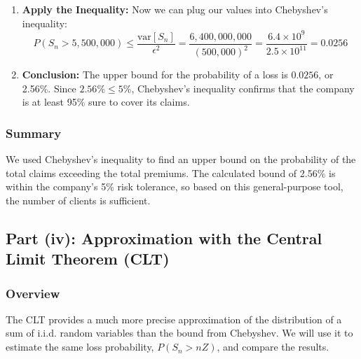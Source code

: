 \documentclass[11pt,a4paper]{article}
\begin{document}
\begin{enumerate}
    \item \textbf{Apply the Inequality:} Now we can plug our values into Chebyshev's inequality:
    \[ P(S_n > 5,500,000) \le \frac{\text{var}[S_n]}{\epsilon^2} = \frac{6,400,000,000}{(500,000)^2} = \frac{6.4 \times 10^9}{2.5 \times 10^{11}} = 0.0256 \]

    \item \textbf{Conclusion:} The upper bound for the probability of a loss is $0.0256$, or 2.56\%. Since $2.56\% \le 5\%$, Chebyshev's inequality confirms that the company is at least 95\% sure to cover its claims.
\end{enumerate}

\subsubsection{Summary}
We used Chebyshev's inequality to find an upper bound on the probability of the total claims exceeding the total premiums. The calculated bound of 2.56\% is within the company's 5\% risk tolerance, so based on this general-purpose tool, the number of clients is sufficient.

\subsection{Part (iv): Approximation with the Central Limit Theorem (CLT)}

\subsubsection{Overview}
The CLT provides a much more precise approximation of the distribution of a sum of i.i.d. random variables than the bound from Chebyshev. We will use it to estimate the same loss probability, $P(S_n > nZ)$, and compare the results.
\end{document}
